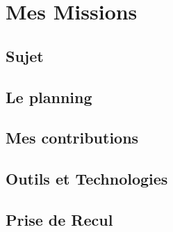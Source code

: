 \chapter{Mes Missions}
    \lipsum[1]

\section{Sujet}
    \lipsum[1-2]


\section{Le planning}
    \lipsum[1-2]



\section{Mes contributions}
    \lipsum[1-2]






\section{Outils et Technologies}
    \lipsum[1-2]



\section{Prise de Recul}
    \lipsum[1-2]




